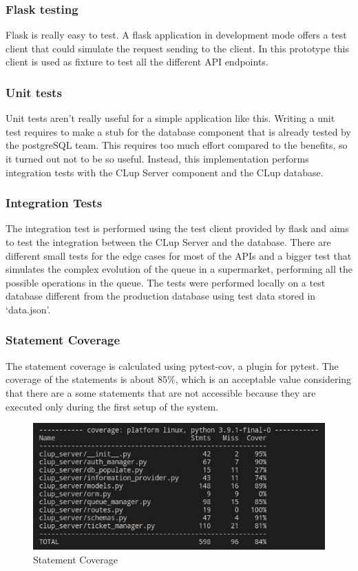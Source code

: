 \subsubsection{Flask testing}
Flask is really easy to test. A flask application in development mode offers a test client that could simulate the request sending to the client. In this prototype this client is used as fixture to test all the different API endpoints.

\subsubsection{Unit tests}
Unit tests aren't really useful for a simple application like this. Writing a unit test requires to make a stub for the database component that is already tested by the postgreSQL team. This requires too much effort compared to the benefits, so it turned out not to be so useful. Instead, this implementation performs integration tests with the CLup Server component and the CLup database.

\subsubsection{Integration Tests}
The integration test is performed using the test client provided by flask and aims to test the integration between the CLup Server and the database. There are different small tests for the edge cases  for most of the APIs and a bigger test that simulates the complex evolution of the queue in a supermarket, performing all the possible operations in the queue. The tests were performed locally on a test database different from the production database using test data stored in `data.json'.

\subsubsection{Statement Coverage}
The statement coverage is calculated using pytest-cov, a plugin for pytest. The coverage of the statements is about 85\%, which is an acceptable value considering that there are a some statements that are not accessible because they are executed only during the first setup of the system.
\begin{figure}[h!t]
    \centering
    \includegraphics[width=\textwidth]{Images/coverage.jpeg}
    \caption{\label{fig:General Component}Statement Coverage}
\end{figure}


